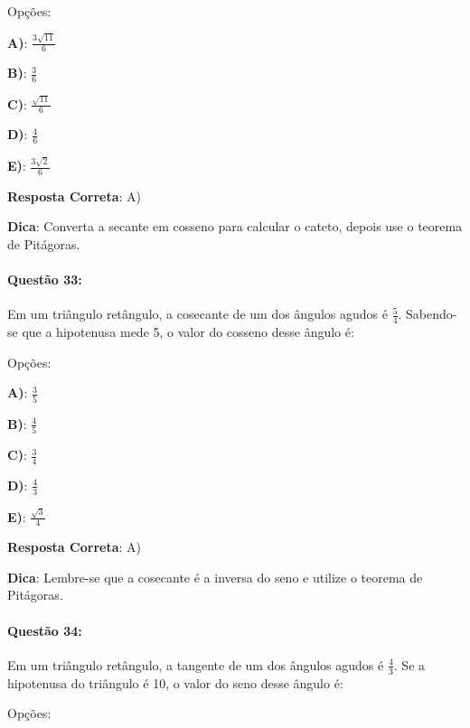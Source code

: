 \documentclass{article}
\begin{document}
\vspace{\baselineskip}Opções:

\vspace{\baselineskip}\textbf{A)}: \( \frac{3\sqrt{11}}{6} \) 

\textbf{B)}: \( \frac{3}{6} \) 

\textbf{C)}: \( \frac{\sqrt{11}}{6} \) 

\textbf{D)}: \( \frac{4}{6} \) 

\textbf{E)}: \( \frac{3\sqrt{2}}{6} \) 

\vspace{\baselineskip}\textbf{Resposta Correta}: A)

\vspace{\baselineskip}\textbf{Dica}: Converta a secante em cosseno para calcular o cateto, depois use o teorema de Pitágoras.

\paragraph{Questão 33:}
{Em um triângulo retângulo, a cosecante de um dos ângulos agudos é \( \frac{5}{4} \). Sabendo-se que a hipotenusa mede 5, o valor do cosseno desse ângulo é:}

\vspace{\baselineskip}Opções:

\vspace{\baselineskip}\textbf{A)}: \( \frac{3}{5} \) 

\textbf{B)}: \( \frac{4}{5} \) 

\textbf{C)}: \( \frac{3}{4} \) 

\textbf{D)}: \( \frac{4}{3} \) 

\textbf{E)}: \( \frac{\sqrt{3}}{4} \) 

\vspace{\baselineskip}\textbf{Resposta Correta}: A)

\vspace{\baselineskip}\textbf{Dica}: Lembre-se que a cosecante é a inversa do seno e utilize o teorema de Pitágoras.

\paragraph{Questão 34:}
{Em um triângulo retângulo, a tangente de um dos ângulos agudos é \( \frac{4}{3} \). Se a hipotenusa do triângulo é 10, o valor do seno desse ângulo é:}

\vspace{\baselineskip}Opções:
\end{document}
